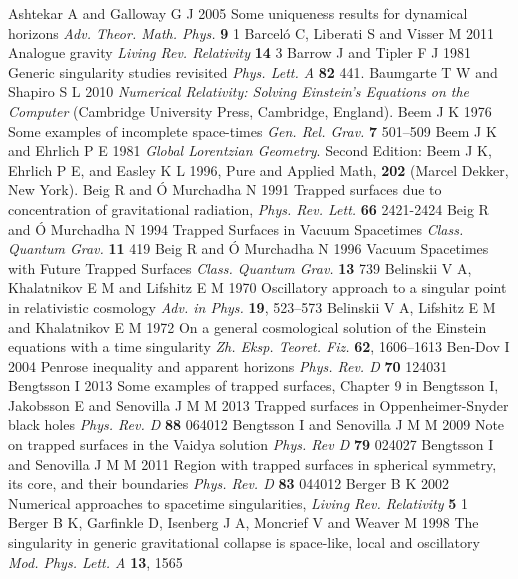 \documentclass[12pt]{iopart}
\begin{document}
\begin{thebibliography}{999}
 Ashtekar A and Galloway G J 2005 Some uniqueness results for dynamical horizons {\it Adv. Theor. Math. Phys.} {\bf 9} 1
 Barcel\'o C, Liberati S and Visser M 2011 Analogue gravity {\it Living Rev. Relativity} {\bf  14} 3
 Barrow J and Tipler F J 1981 Generic singularity studies revisited {\it Phys. Lett. A} {\bf 82} 441.%
 Baumgarte T W and Shapiro S L 2010 {\it Numerical Relativity:
Solving Einstein's Equations on the Computer} (Cambridge University Press, Cambridge, England).
 Beem J K 1976 Some examples of incomplete space-times {\it  Gen. Rel. Grav.} {\bf 7}  501--509
 Beem J K and Ehrlich P E 1981 {\it Global Lorentzian
Geometry}. Second Edition: Beem J K, Ehrlich P E, and Easley K L 1996,
Pure and Applied Math, {\bf 202} (Marcel Dekker, New York).
 Beig R and \'O Murchadha N 1991 Trapped surfaces due to concentration of gravitational radiation, {\it Phys. Rev. Lett. } {\bf 66} 2421-2424
 Beig R and \'{O} Murchadha N 1994 Trapped Surfaces in Vacuum
Spacetimes {\it Class. Quantum Grav.} {\bf 11} 419
 Beig R and \'{O} Murchadha N 1996
Vacuum Spacetimes with Future Trapped Surfaces {\it Class. Quantum Grav.} {\bf 13} 739
 Belinskii V A, Khalatnikov E M and Lifshitz E M 1970
Oscillatory approach to a singular point in relativistic cosmology {\it Adv. in Phys.} {\bf 19}, 523--573
 Belinskii V A, Lifshitz E M and Khalatnikov E M 1972 On a general cosmological solution of the Einstein equations with a time singularity {\it Zh. Eksp. Teoret. Fiz.} {\bf 62},  1606--1613
 Ben-Dov I 2004 Penrose inequality and apparent horizons {\it Phys. Rev. D} {\bf  70} 124031
 Bengtsson I 2013 Some examples of trapped surfaces, Chapter 9 in \cite{HayBook}
 Bengtsson I, Jakobsson E and Senovilla J M M 2013 Trapped surfaces in Oppenheimer-Snyder black holes {\it Phys. Rev. D} {\bf 88} 064012
 Bengtsson I and Senovilla J M M 2009 Note on trapped surfaces in the Vaidya solution {\it Phys. Rev D} {\bf 79} 024027
 Bengtsson I and Senovilla J M M 2011 Region with trapped surfaces in spherical symmetry, its core, and their boundaries {\it Phys. Rev. D} {\bf 83} 044012
 Berger B K 2002 Numerical approaches to spacetime singularities, {\it 
Living Rev. Relativity} {\bf 5} 1
 Berger B K, Garfinkle D, Isenberg J A, Moncrief V and Weaver M 1998 The singularity in generic gravitational collapse is space-like, local and oscillatory {\it Mod. Phys. Lett. A} {\bf 13}, 1565

\end{thebibliography}
\end{document}
